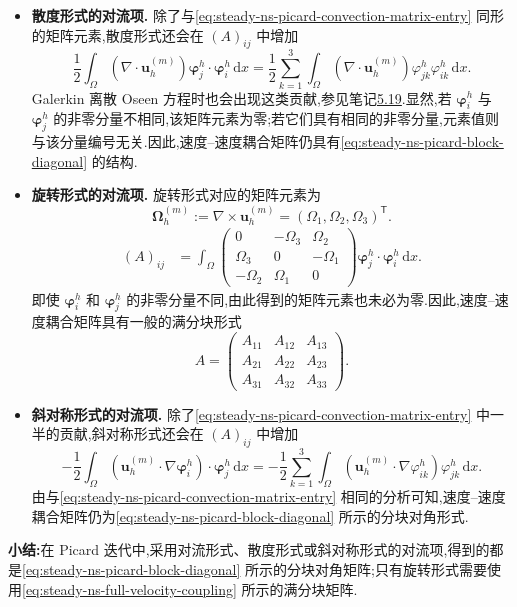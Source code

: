 \begin{note}
\begin{itemize}
  \item \textbf{散度形式的对流项.}
  除了与\cref{eq:steady-ns-picard-convection-matrix-entry} 同形的矩阵元素,散度形式还会在 $(A)_{ij}$ 中增加
  \[
    \frac12\int_\Omega
       (\nabla\cdot\bm{u}_h^{(m)})
       \symbf{\varphi}_j^h\cdot\symbf{\varphi}_i^h\,\mathrm{d}x
    =
    \frac12\sum_{k=1}^{3}\int_\Omega
       (\nabla\cdot\bm{u}_h^{(m)})
       \varphi_{jk}^h\varphi_{ik}^h\,\mathrm{d}x.
  \]
  Galerkin 离散 Oseen 方程时也会出现这类贡献,参见笔记\hyperref[note:oseen-fem-implementation]{5.19}.显然,若 $\symbf{\varphi}_i^h$ 与 $\symbf{\varphi}_j^h$ 的非零分量不相同,该矩阵元素为零;若它们具有相同的非零分量,元素值则与该分量编号无关.因此,速度--速度耦合矩阵仍具有\cref{eq:steady-ns-picard-block-diagonal} 的结构.

  \item \textbf{旋转形式的对流项.}
  旋转形式对应的矩阵元素为
  \[
    \symbf{\Omega}_h^{(m)}
       :=\nabla\times\bm{u}_h^{(m)}
       =(\Omega_1,\Omega_2,\Omega_3)^{\mathsf T}.
  \]
  \[
  \begin{aligned}
    (A)_{ij}
      &=\int_\Omega
        \begin{pmatrix}
          0&-\Omega_3&\Omega_2\\
          \Omega_3&0&-\Omega_1\\
          -\Omega_2&\Omega_1&0
        \end{pmatrix}
        \symbf{\varphi}_j^h\cdot\symbf{\varphi}_i^h
        \,\mathrm{d}x .
  \end{aligned}
  \]
  即使 $\symbf{\varphi}_i^h$ 和 $\symbf{\varphi}_j^h$ 的非零分量不同,由此得到的矩阵元素也未必为零.因此,速度--速度耦合矩阵具有一般的满分块形式
  \begin{equation}\label{eq:steady-ns-full-velocity-coupling}
    A=
    \begin{pmatrix}
      A_{11}&A_{12}&A_{13}\\
      A_{21}&A_{22}&A_{23}\\
      A_{31}&A_{32}&A_{33}
    \end{pmatrix}.
  \end{equation}

  \item \textbf{斜对称形式的对流项.}
  除了\cref{eq:steady-ns-picard-convection-matrix-entry} 中一半的贡献,斜对称形式还会在 $(A)_{ij}$ 中增加
  \[
    -\frac12\int_\Omega
       (\bm{u}_h^{(m)}\cdot\nabla\symbf{\varphi}_i^h)
       \cdot\symbf{\varphi}_j^h\,\mathrm{d}x
    =
    -\frac12\sum_{k=1}^{3}\int_\Omega
       (\bm{u}_h^{(m)}\cdot\nabla\varphi_{ik}^h)
       \varphi_{jk}^h\,\mathrm{d}x .
  \]
  由与\cref{eq:steady-ns-picard-convection-matrix-entry} 相同的分析可知,速度--速度耦合矩阵仍为\cref{eq:steady-ns-picard-block-diagonal} 所示的分块对角形式.
\end{itemize}
\textbf{小结:}在 Picard 迭代中,采用对流形式、散度形式或斜对称形式的对流项,得到的都是\cref{eq:steady-ns-picard-block-diagonal} 所示的分块对角矩阵;只有旋转形式需要使用\cref{eq:steady-ns-full-velocity-coupling} 所示的满分块矩阵.
\end{note}

